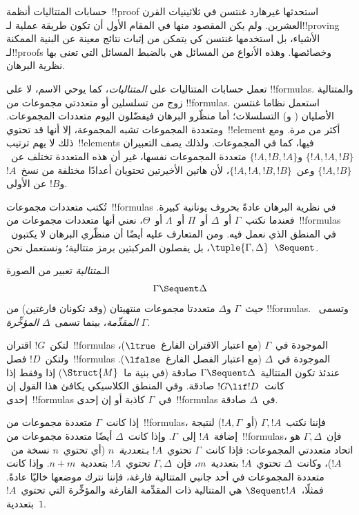 \documentclass[../../../include/open-logic-section]{subfiles}
\begin{document}


حسابات المتتاليات أنظمة~!!{proof} استحدثها غيرهارد غنتسن في ثلاثينيات
القرن العشرين. ولم يكن المقصود منها في المقام الأول أن تكون طريقة عملية
لـ!!{proving} الأشياء، بل استخدمها غنتسن كي يتمكن من إثبات نتائج معينة
عن البنية الممكنة لـ!!{proof}s وخصائصها. وهذه الأنواع من المسائل هي بالضبط
المسائل التي تعنى بها نظرية البرهان.

تعمل حسابات المتتاليات على \emph{المتتاليات}، كما يوحي الاسم، لا على
!!{formula}s. والمتتالية زوج من تسلسلين أو متعددتي مجموعات من
!!{formula}s. استعمل نظاما غنتسن الأصليان ( و)
التسلسلات؛ أما منظّرو البرهان فيفضّلون اليوم متعددات المجموعات. ومتعددة
المجموعات تشبه المجموعة، إلا أنها قد تحتوي~!!{element} أكثر من مرة. ومع
ذلك لا يهم ترتيب~!!{element}s فيها، كما في المجموعات. ولذلك يصف التعبيران
$\{!A, !A, !B\}$ و$\{!A, !B, !A\}$ متعددة المجموعات نفسها، غير أن هذه
المتعددة تختلف عن~$\{!A,!B\}$ وعن~$\{!A,!A,!B,!B\}$، لأن هاتين الأخيرتين
تحتويان أعدادًا مختلفة من نسخ~$!A$ و$!B$ عن الأولى.

تُكتب متعددات مجموعات~!!{formula}s في نظرية البرهان عادةً بحروف يونانية
كبيرة. فعندما نكتب~$\Gamma$ أو~$\Delta$ أو~$\Pi$ أو~$\Lambda$ أو~$\Theta$،
نعني أنها متعددات مجموعات من~!!{formula}s في المنطق الذي نعمل فيه. ومن
المتعارف عليه أيضًا أن منظّري البرهان لا يكتبون~$\tuple{\Gamma,\Delta}$،
بل يفصلون المركبتين برمز متتالية؛ ونستعمل نحن~$\Sequent$.

\begin{defn}[متتالية]
الـ\emph{متتالية} تعبير من الصورة
\[
\Gamma \Sequent \Delta
\]
حيث~$\Gamma$ و$\Delta$ متعددتا مجموعات منتهيتان (وقد تكونان فارغتين) من
!!{formula}s. وتسمى~$\Gamma$ \emph{المقدِّمة}، بينما تسمى~$\Delta$
\emph{المؤخِّرة}.
\end{defn}

لتكن~$!G$ اقتران~!!{formula}s الموجودة في~$\Gamma$ (مع اعتبار الاقتران
الفارغ~$\ltrue$)، ولتكن~$!D$ فصل~!!{formula}s الموجودة في~$\Delta$ (مع
اعتبار الفصل الفارغ~$\lfalse$). عندئذ تكون المتتالية~$\Gamma\Sequent\Delta$
صادقة (في بنية ما~$\Struct{M}$) إذا وفقط إذا كانت~$!G\lif !D$ صادقة. وفي
المنطق الكلاسيكي يكافئ هذا القول إن إحدى~!!{formula}s في~$\Gamma$ كاذبة
أو إن إحدى~!!{formula}s في~$\Delta$ صادقة.

إذا كانت~$\Gamma$ متعددة مجموعات من~!!{formula}s، فإننا نكتب~$\Gamma,!A$
(أو~$!A,\Gamma$) لنتيجة إضافة~$!A$ إلى~$\Gamma$. وإذا كانت~$\Delta$ أيضًا
متعددة مجموعات من~!!{formula}s، فإن~$\Gamma,\Delta$ هو اتحاد متعددتي
المجموعات: فإذا كانت~$\Gamma$ تحتوي~$!A$ بـ\emph{تعددية}~$n$ (أي تحتوي~$n$ نسخة
من~$!A$)، وكانت~$\Delta$ تحتوي~$!A$ بتعددية~$m$، فإن~$\Gamma,\Delta$
تحتوي~$!A$ بتعددية~$n+m$. وإذا كانت متعددة المجموعات في أحد جانبي
المتتالية فارغة، فإننا نترك موضعها خاليًا عادةً. فمثلًا،~$\Sequent !A$
هي المتتالية ذات المقدِّمة الفارغة والمؤخِّرة التي تحتوي~$!A$ بتعددية~$1$.
\end{document}
